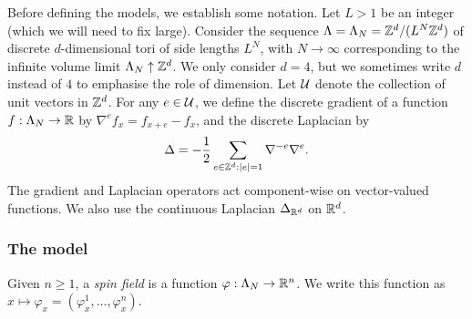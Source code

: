 Before defining the models, we establish some notation.
Let $L > 1$ be an integer (which we will need to fix large).
Consider the sequence $\Lambda=\Lambda_N = {\mathbb Z}^d/(L^N{\mathbb Z}^d)$ of
discrete $d$-dimensional tori of side lengths $L^N$,
with $N \to \infty$ corresponding to the infinite volume limit $\Lambda_N \uparrow {\mathbb Z}^d$.
We only consider $d=4$, but we sometimes write $d$ instead of $4$
to emphasise the role of dimension.
Let $\mathcal{U}$ denote the collection of unit vectors in ${ {{\mathbb Z}}^d }$. %
For any $e \in \mathcal{U}$, %
we define the discrete gradient of a function $f:\Lambda_N \rightarrow {\mathbb R}$
by $\nabla^e f_x = f_{x + e} - f_x$, and
the discrete Laplacian by
\begin{equation}
\label{e:DeltaLambda}
\Delta = -\frac{1}{2}\sum_{e\in{\mathbb Z}^d:|e| = 1}\nabla^{-e} \nabla^{e}.
\end{equation}
The gradient and Laplacian operators act component-wise on vector-valued functions.
We also use the
continuous Laplacian $\Delta_{{ {{\mathbb R}}^d}}$ on ${ {{\mathbb R}}^d}$.

\subsubsection{The \texorpdfstring{\phifour}{phi4} model}


Given $n \ge 1$,
a \emph{spin field} is a function $\varphi : \Lambda_N \rightarrow {\mathbb R}^n$.
We write this function as $x \mapsto \varphi_x =(\varphi_x^1,\ldots,\varphi_x^n)$.

